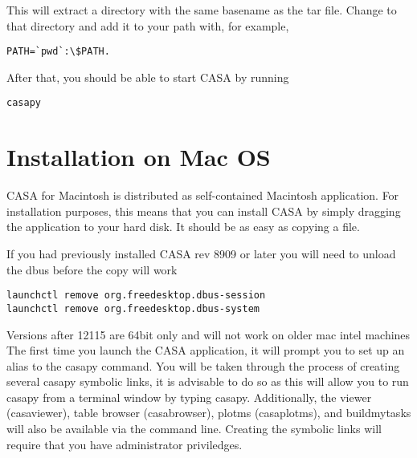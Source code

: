 This will extract a directory with the same basename as the tar
file. Change to that directory and add it to your path with, for
example, 

\small
\begin{verbatim}
PATH=`pwd`:\$PATH.
\end{verbatim}
\normalsize

After that, you should be able to start CASA by running
\small
\begin{verbatim}
casapy
\end{verbatim}
\normalsize


\section{Installation on Mac OS}

CASA for Macintosh is distributed as self-contained Macintosh
application. For installation purposes, this means that you can
install CASA by simply dragging the application to your hard disk. It
should be as easy as copying a file.


If you had previously installed CASA rev 8909 or later you will need
to unload the dbus before the copy will work

\small
\begin{verbatim}
launchctl remove org.freedesktop.dbus-session
launchctl remove org.freedesktop.dbus-system
\end{verbatim}
\normalsize

Versions after 12115 are 64bit only and will not work on older mac
intel machines The first time you launch the CASA application, it will
prompt you to set up an alias to the casapy command. You will be taken
through the process of creating several casapy symbolic links, it is
advisable to do so as this will allow you to run casapy from a
terminal window by typing casapy. Additionally, the viewer
(casaviewer), table browser (casabrowser), plotms (casaplotms), and
buildmytasks will also be available via the command line. Creating the
symbolic links will require that you have administrator priviledges.


